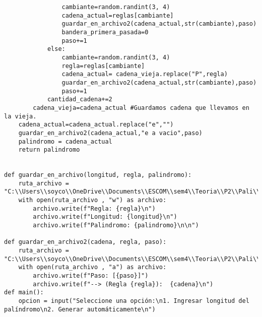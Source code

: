 \begin{lstlisting}
                cambiante=random.randint(3, 4)
                cadena_actual=reglas[cambiante]
                guardar_en_archivo2(cadena_actual,str(cambiante),paso)
                bandera_primera_pasada=0
                paso+=1
            else:
                cambiante=random.randint(3, 4)
                regla=reglas[cambiante]
                cadena_actual= cadena_vieja.replace("P",regla)
                guardar_en_archivo2(cadena_actual,str(cambiante),paso)
                paso+=1
            cantidad_cadena+=2
        cadena_vieja=cadena_actual #Guardamos cadena que llevamos en la vieja.
    cadena_actual=cadena_actual.replace("e","")
    guardar_en_archivo2(cadena_actual,"e a vacio",paso)
    palindromo = cadena_actual
    return palindromo


def guardar_en_archivo(longitud, regla, palindromo):
    ruta_archivo = "C:\\Users\\soyco\\OneDrive\\Documents\\ESCOM\\sem4\\Teoria\\P2\\Pali\\output\\palindromos.txt"
    with open(ruta_archivo , "w") as archivo:
        archivo.write(f"Regla: {regla}\n")
        archivo.write(f"Longitud: {longitud}\n")
        archivo.write(f"Palindromo: {palindromo}\n\n")
        
def guardar_en_archivo2(cadena, regla, paso):
    ruta_archivo = "C:\\Users\\soyco\\OneDrive\\Documents\\ESCOM\\sem4\\Teoria\\P2\\Pali\\output\\construccion.txt"
    with open(ruta_archivo , "a") as archivo:     
        archivo.write(f"Paso: [{paso}]")
        archivo.write(f"--> (Regla {regla}):  {cadena}\n")
def main():
    opcion = input("Seleccione una opción:\n1. Ingresar longitud del palíndromo\n2. Generar automáticamente\n")
    

\end{lstlisting}
